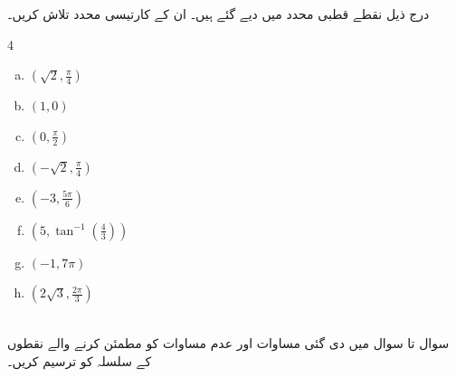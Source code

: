 درج ذیل نقطے قطبی محدد میں دیے گئے ہیں۔ ان کے  کارتیسی محدد تلاش کریں۔
\begin{multicols}{4}
\begin{enumerate}[a.]
\item
$(\sqrt{2},\tfrac{\pi}{4})$
\item
$(1,0)$
\item
$(0,\tfrac{\pi}{2})$
\item
$(-\sqrt{2},\tfrac{\pi}{4})$
\item
$(-3,\tfrac{5\pi}{6})$
\item
$(5,\tan^{-1}(\tfrac{4}{3}))$
\item
$(-1,7\pi)$
\item
$(2\sqrt{3},\tfrac{2\pi}{3})$
\end{enumerate}
\end{multicols}
\\
سوال  تا سوال  میں دی گئی مساوات اور عدم مساوات کو مطمئن کرنے والے نقطوں کے سلسلہ کو ترسیم کریں۔ 

